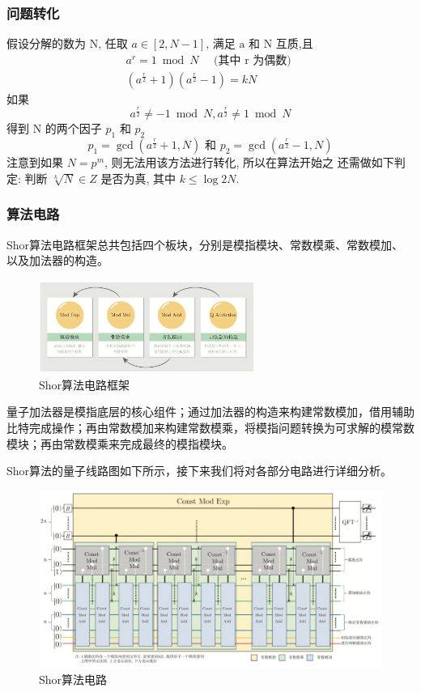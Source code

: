 \documentclass[12pt,hyperref,a4paper,UTF8]{ctexart}
\begin{document}
\subsubsection{问题转化}
假设分解的数为 $\mathrm{N}$, 任取 $a \in[2, N-1]$, 满足 $\mathrm{a}$ 和 $\mathrm{N}$ 互质,且
$$
\begin{array}{l}
a^r=1 \bmod N \quad \text { (其中 } \mathrm{r} \text { 为偶数) } \\
\left(a^{\frac{r}{2}}+1\right)\left(a^{\frac{r}{2}}-1\right)=k N
\end{array}
$$
如果
$$
a^{\frac{r}{2}} \neq-1 \bmod N, a^{\frac{r}{2}} \neq 1 \bmod N
$$
得到 $\mathrm{N}$ 的两个因子 $p_1$ 和 $p_2$
$$
p_1=\operatorname{gcd}\left(a^{\frac{r}{2}}+1, N\right) \text { 和 } p_2=\operatorname{gcd}\left(a^{\frac{r}{2}}-1, N\right)
$$
注意到如果 $N=p^m$, 则无法用该方法进行转化, 所以在算法开始之 还需做如下判定: 判断 $\sqrt[k]{N} \in Z$ 是否为真, 其中 $k \leq \log 2 N$.

\subsubsection{算法电路}
Shor算法电路框架总共包括四个板块，分别是模指模块、常数模乘、常数模加、以及加法器的构造。

\begin{figure}[!htbp]     
    \centering     
    \includegraphics[width =0.63\textwidth]{figures/Shor算法电路框架.png}     
    \caption{Shor算法电路框架}
\end{figure}
\newpage

\noindent
量子加法器是模指底层的核心组件；通过加法器的构造来构建常数模加，借用辅助比特完成操作；再由常数模加来构建常数模乘，将模指问题转换为可求解的模常数模块；再由常数模乘来完成最终的模指模块。

Shor算法的量子线路图如下所示，接下来我们将对各部分电路进行详细分析。

\begin{figure}[!htbp]     
    \centering     
    \includegraphics[width =0.95 \textwidth]{figures/Shor算法电路.png}     
    \caption{Shor算法电路}
\end{figure}
\end{document}
